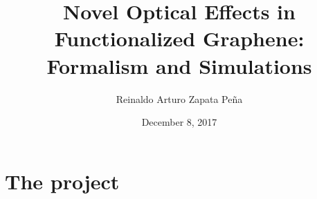 \documentclass{beamer}
\title[Novel Optical Effects in Functionalized Graphene: 
Formalism and Simulations]
{Novel Optical Effects in Functionalized Graphene: 
Formalism and Simulations}
\author{Reinaldo Arturo Zapata Pe\~na}
\institute{Centro de Investigaciones en \'Optica, A.C.}
\date{December 8, 2017}
\begin{document}
\section*{The project}





\begin{frame}
\maketitle
\end{frame}









    








\end{document}
